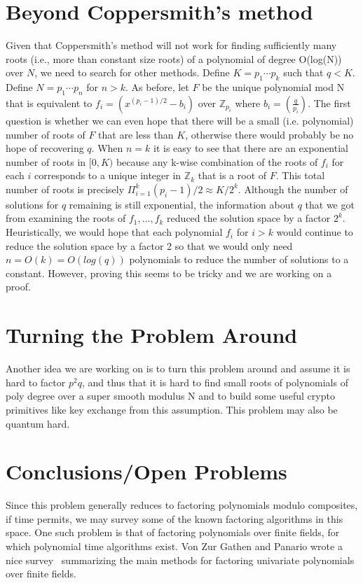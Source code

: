 \documentclass[letterpaper,twocolumn,10pt]{article}
\begin{document}
\section{Beyond Coppersmith's method} 
Given that Coppersmith's method will not work for finding sufficiently many roots (i.e., more than constant size roots) of a polynomial of degree O(log(N)) over $N$, we need to search for other methods. Define $K = p_1 \cdots p_k$ such that $q < K$. Define $N = p_1 \cdots p_n$ for $n > k$. As before, let $F$ be the unique polynomial mod N that is equivalent to $f_i = (x^{(p_i - 1)/2} - b_i)$ over $\mathbb{Z}_{p_i}$ where $b_i =  \left(\frac{q}{p_i}\right)$. The first question is whether we can even hope that there will be a small (i.e. polynomial) number of roots of $F$ that are less than $K$, otherwise there would probably be no hope of recovering $q$. When $n = k$ it is easy to see that there are an exponential number of roots in $[0, K)$ because any k-wise combination of the roots of $f_i$ for each $i$ corresponds to a unique integer in $\mathbb{Z}_k$ that is a root of $F$. This total number of roots is precisely $\Pi_{i= 1}^k (p_i - 1)/2 \approx K/2^k$. Although the number of solutions for $q$ remaining is still exponential, the information about $q$ that we got from examining the roots of $f_1,...,f_k$ reduced the solution space by a factor $2^k$. Heuristically, we would hope that each polynomial $f_i$ for $i > k$ would continue to reduce the solution space by a factor 2 so that we would only need $n = O(k) = O(log(q))$ polynomials to reduce the number of solutions to a constant. However, proving this seems to be tricky and we are working on a proof. 

\section{Turning the Problem Around} 
Another idea we are working on is to turn this problem around and assume it is hard to factor $p^2q$, and thus that it is hard to find small roots of polynomials of poly degree over a super smooth modulus N and to build some useful crypto primitives like key exchange from this assumption. This problem may also be quantum hard. 

\section{Conclusions/Open Problems}

Since this problem generally reduces to factoring polynomials modulo composites, if time permits, we may survey some of the known factoring algorithms in this space. One such problem is that of factoring polynomials over finite fields, for which polynomial time algorithms exist. Von Zur Gathen and Panario wrote a nice survey~\cite{Gathen} summarizing the main methods for factoring univariate polynomials over finite fields. 



{\footnotesize 
}


\end{document}
